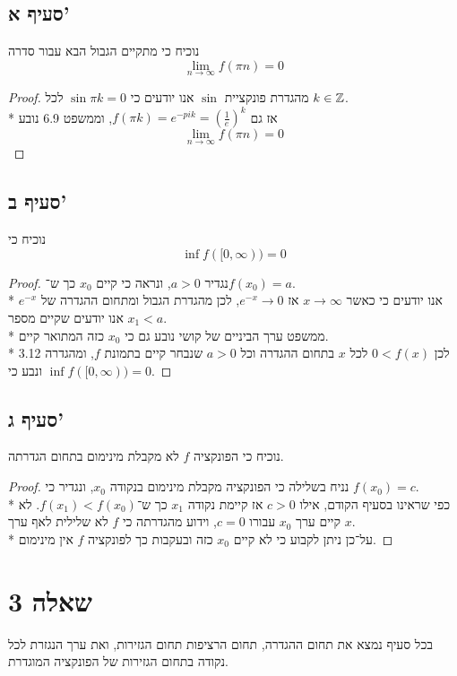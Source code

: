\subsection{סעיף א'}
נוכיח כי מתקיים הגבול הבא עבור סדרה
\[
	\lim_{n \to \infty} f(\pi n) = 0
\]
\begin{proof}
	מהגדרת פונקציית $\sin$ אנו יודעים כי $\sin \pi k = 0$ לכל $k \in \mathbb{Z}$. \\*
	אז גם $f(\pi k) = e^{-pi k} = {(\frac{1}{e})}^k$, וממשפט 6.9 נובע
	\[
		\lim_{n \to \infty} f(\pi n) = 0
	\]
\end{proof}

\subsection{סעיף ב'}
נוכיח כי
\[
	\inf f([0, \infty)) = 0 %
\]
\begin{proof}
	נגדיר $a > 0$, ונראה כי קיים $x_0$ כך ש־$f(x_0) = a$. \\*
	אנו יודעים כי כאשר $x \to \infty$ אז $e^{-x} \to 0$, לכן מהגדרת הגבול ומתחום ההגדרה של $e^{-x}$ אנו יודעים שקיים מספר $x_1 < a$. \\*
	ממשפט ערך הביניים של קושי נובע גם כי $x_0$ כזה המתואר קיים. \\*
	לכן $0 < f(x)$ לכל $x$ בתחום ההגדרה וכל $a > 0$ שנבחר קיים בתמונת $f$, ומהגדרה 3.12 ונבע כי $\inf f([0, \infty)) = 0$. %
\end{proof}

\subsection{סעיף ג'}
נוכיח כי הפונקציה $f$ לא מקבלת מינימום בתחום הגדרתה.
\begin{proof}
	נניח בשלילה כי הפונקציה מקבלת מינימום בנקודה $x_0$, ונגדיר כי $f(x_0) = c$. \\*
	כפי שראינו בסעיף הקודם, אילו $c > 0$ אז קיימת נקודה $x_1$ כך ש־$f(x_1) < f(x_0)$.
	לא קיים ערך $x_0$ עבורו $c = 0$, וידוע מהגדרתה כי $f$ לא שלילית לאף ערך $x$. \\*
	על־כן ניתן לקבוע כי לא קיים $x_0$ כזה ובעקבות כך לפונקציה $f$ אין מינימום.
\end{proof}

\section{שאלה 3}
בכל סעיף נמצא את תחום ההגדרה, תחום הרציפות תחום הגזירות, ואת ערך הנגזרת לכל נקודה בתחום הגזירות של הפונקציה המוגדרת.

